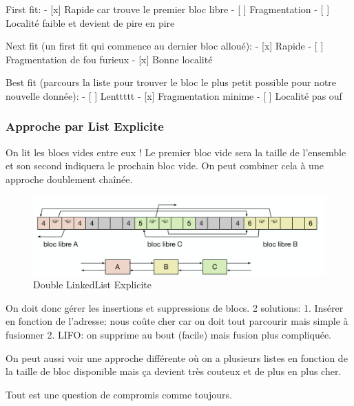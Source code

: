 First fit: - {[}x{]} Rapide car trouve le premier bloc libre - {[} {]}
Fragmentation - {[} {]} Localité faible et devient de pire en pire

Next fit (un first fit qui commence au dernier bloc alloué): - {[}x{]}
Rapide - {[} {]} Fragmentation de fou furieux - {[}x{]} Bonne localité

Best fit (parcours la liste pour trouver le bloc le plus petit possible
pour notre nouvelle donnée): - {[} {]} Lenttttt - {[}x{]} Fragmentation
minime - {[} {]} Localité pas ouf

\subsubsection{Approche par List
Explicite}\label{approche-par-list-explicite}

On lit les blocs vides entre eux ! Le premier bloc vide sera la taille
de l'ensemble et son second indiquera le prochain bloc vide. On peut
combiner cela à une approche doublement chaînée.

\begin{figure}
\centering
\includegraphics{image-51.png}
\caption{Double LinkedList Explicite}
\end{figure}

On doit donc gérer les insertions et suppressions de blocs. 2 solutions:
1. Insérer en fonction de l'adresse: nous coûte cher car on doit tout
parcourir mais simple à fusionner 2. LIFO: on supprime au bout (facile)
mais fusion plus compliquée.

On peut aussi voir une approche différente où on a plusieurs listes en
fonction de la taille de bloc disponible mais ça devient très couteux et
de plus en plus cher.

Tout est une question de compromis comme toujours.

